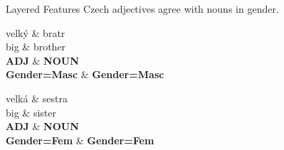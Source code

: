 \documentclass[10pt, compress, aspectratio=169]{beamer}
\newcommand{\upos}[1]{\textbf{\color{blue}#1}}
\newcommand{\feat}[1]{\textbf{\footnotesize\color{red}#1}}
\begin{document}
\begin{frame}{Layered Features}
Czech adjectives agree with nouns in gender.

\begin{dependency}[label style={thick, font=\bfseries}]
\begin{deptext}[font=\bfseries]
velký \& bratr \\
big   \& brother \\
\upos{ADJ} \& \upos{NOUN} \\
\feat{Gender=Masc} \& \feat{Gender=Masc} \\
\end{deptext}
\end{dependency}

\begin{dependency}[label style={thick, font=\bfseries}]
\begin{deptext}[font=\bfseries]
velká \& sestra \\
big   \& sister \\
\upos{ADJ} \& \upos{NOUN} \\
\feat{Gender=Fem} \& \feat{Gender=Fem} \\
\end{deptext}
\end{dependency}
\end{frame}
\end{document}
